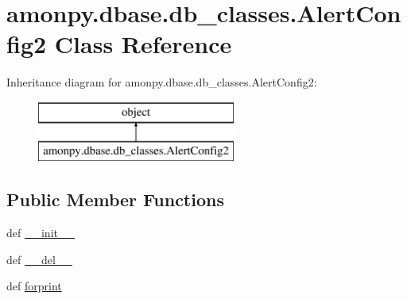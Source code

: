 \hypertarget{classamonpy_1_1dbase_1_1db__classes_1_1_alert_config2}{\section{amonpy.\-dbase.\-db\-\_\-classes.\-Alert\-Config2 Class Reference}
\label{classamonpy_1_1dbase_1_1db__classes_1_1_alert_config2}
}
Inheritance diagram for amonpy.\-dbase.\-db\-\_\-classes.\-Alert\-Config2\-:\begin{figure}[H]
\begin{center}
\leavevmode
\includegraphics[height=2.000000cm]{classamonpy_1_1dbase_1_1db__classes_1_1_alert_config2}
\end{center}
\end{figure}
\subsection*{Public Member Functions}
\begin{DoxyCompactItemize}
\item 
def \hyperlink{classamonpy_1_1dbase_1_1db__classes_1_1_alert_config2_af8f26a222e6993c3641895b85501a7dc}{\-\_\-\-\_\-init\-\_\-\-\_\-}
\item 
def \hyperlink{classamonpy_1_1dbase_1_1db__classes_1_1_alert_config2_ac28bc62a993c42b0e909f7cf7fdb6c50}{\-\_\-\-\_\-del\-\_\-\-\_\-}
\item 
def \hyperlink{classamonpy_1_1dbase_1_1db__classes_1_1_alert_config2_ae52dafae228b81cf695bcde9ddb724be}{forprint}
\end{DoxyCompactItemize}
